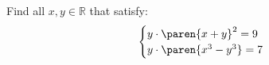 Find all $x, y \in \mathbb{R}$ that satisfy:
\begin{align*}
\begin{cases}
  y \cdot \paren{x + y}^2 = 9 \\
  y \cdot \paren{x^3 - y^3} = 7
\end{cases}
\end{align*}
